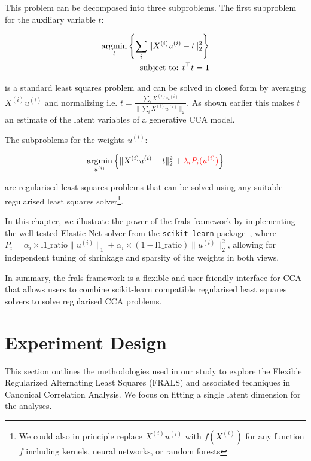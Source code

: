 This problem can be decomposed into three subproblems.
The first subproblem for the auxiliary variable \(t\):

\begin{align}
    \underset{t}{\mathrm{argmin}}\left\{\sum_i \|X^{(i)} u^{(i)} - t\|_2^2\right\}\\
    \text{subject to: }t^\top t = 1 \notag
\end{align}

is a standard least squares problem and can be solved in closed form by averaging \(X^{(i)} u^{(i)}\) and normalizing i.e. \(t = \frac{\sum_i X^{(i)} u^{(i)}}{\|\sum_i X^{(i)} u^{(i)}\|_2}\).
As shown earlier this makes \(t\) an estimate of the latent variables of a generative CCA model.

The subproblems for the weights \(u^{(i)}\):

\begin{align}
    \underset{u^{(i)}}{\mathrm{argmin}}\left\{\|X^{(i)} u^{(i)} - t\|_2^2 + \textcolor{red}{\lambda_i P_i(u^{(i)})} \right\}
\end{align}

are regularised least squares problems that can be solved using any suitable regularised least squares solver\footnote{We could also in principle replace $X^{(i)} u^{(i)}$ with $f(X^{(i)})$ for any function $f$ including kernels, neural networks, or random forests}.

In this chapter, we illustrate the power of the \acrshort{frals} framework by implementing the well-tested Elastic Net solver from the \texttt{scikit-learn} package~\citep{pedregosa2011scikit}, where \(P_i = \alpha_i \times \text{l1\_ratio} \|u^{(i)}\|_1 + \alpha_i \times (1-\text{l1\_ratio}) \|u^{(i)}\|_2^2\), allowing for independent tuning of shrinkage and sparsity of the weights in both views.

In summary, the \acrshort{frals} framework is a flexible and user-friendly interface for CCA that allows users to combine scikit-learn compatible regularised least squares solvers to solve regularised CCA problems.

\section{Experiment Design}

This section outlines the methodologies used in our study to explore the Flexible Regularized Alternating Least Squares (FRALS) and associated techniques in Canonical Correlation Analysis. We focus on fitting a single latent dimension for the analyses.

